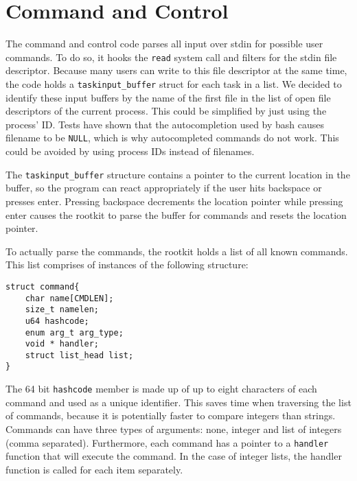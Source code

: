 \section{Command and Control}\label{cnc}
The command and control code parses all input over stdin for possible user 
commands. To do so, it hooks the \texttt{read} system call and filters for the 
stdin file descriptor. Because many users can write to this file descriptor at 
the same time, the code holds a \verb+taskinput_buffer+ struct for each task in 
a list. We decided to identify these input buffers by the name of the first 
file in the list of open file descriptors of the current process. 
This could be simplified by just using the process' ID.
Tests have shown that the autocompletion used by bash causes filename to be 
\texttt{NULL}, which is why autocompleted commands do not work. This could be 
avoided by using process IDs instead of filenames.\par
The \verb+taskinput_buffer+ structure contains a pointer to the current 
location 
in the buffer, so the program can react appropriately if the user hits 
backspace or presses enter. Pressing backspace decrements the location pointer 
while pressing enter causes the rootkit to parse the buffer for commands and 
resets the location pointer.\par
To actually parse the commands, the rootkit holds a list of all known commands. 
This list comprises of instances of the following structure:
\lstset{escapechar=,style=customc}
\begin{lstlisting}
struct command{
	char name[CMDLEN];
	size_t namelen;
	u64 hashcode;
	enum arg_t arg_type;
	void * handler;
	struct list_head list;
}
\end{lstlisting}
The 64 bit \texttt{hashcode} member is made up of up to eight characters of 
each command and used as a unique identifier. This saves time when traversing 
the list of commands, because it is potentially faster to compare integers than 
strings. Commands can have three types of arguments: none, integer and list of 
integers (comma separated).
Furthermore, each command has a pointer to a \texttt{handler} function that 
will 
execute the command. In the case of integer lists, the handler function is 
called for each item separately. 
